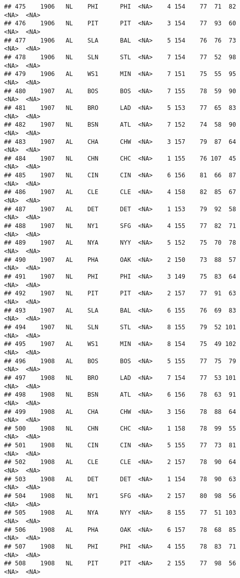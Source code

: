 \documentclass[]{article}
\begin{document}
\begin{verbatim}
## 475    1906   NL    PHI      PHI  <NA>    4 154    77  71  82   <NA>  <NA>
## 476    1906   NL    PIT      PIT  <NA>    3 154    77  93  60   <NA>  <NA>
## 477    1906   AL    SLA      BAL  <NA>    5 154    76  76  73   <NA>  <NA>
## 478    1906   NL    SLN      STL  <NA>    7 154    77  52  98   <NA>  <NA>
## 479    1906   AL    WS1      MIN  <NA>    7 151    75  55  95   <NA>  <NA>
## 480    1907   AL    BOS      BOS  <NA>    7 155    78  59  90   <NA>  <NA>
## 481    1907   NL    BRO      LAD  <NA>    5 153    77  65  83   <NA>  <NA>
## 482    1907   NL    BSN      ATL  <NA>    7 152    74  58  90   <NA>  <NA>
## 483    1907   AL    CHA      CHW  <NA>    3 157    79  87  64   <NA>  <NA>
## 484    1907   NL    CHN      CHC  <NA>    1 155    76 107  45   <NA>  <NA>
## 485    1907   NL    CIN      CIN  <NA>    6 156    81  66  87   <NA>  <NA>
## 486    1907   AL    CLE      CLE  <NA>    4 158    82  85  67   <NA>  <NA>
## 487    1907   AL    DET      DET  <NA>    1 153    79  92  58   <NA>  <NA>
## 488    1907   NL    NY1      SFG  <NA>    4 155    77  82  71   <NA>  <NA>
## 489    1907   AL    NYA      NYY  <NA>    5 152    75  70  78   <NA>  <NA>
## 490    1907   AL    PHA      OAK  <NA>    2 150    73  88  57   <NA>  <NA>
## 491    1907   NL    PHI      PHI  <NA>    3 149    75  83  64   <NA>  <NA>
## 492    1907   NL    PIT      PIT  <NA>    2 157    77  91  63   <NA>  <NA>
## 493    1907   AL    SLA      BAL  <NA>    6 155    76  69  83   <NA>  <NA>
## 494    1907   NL    SLN      STL  <NA>    8 155    79  52 101   <NA>  <NA>
## 495    1907   AL    WS1      MIN  <NA>    8 154    75  49 102   <NA>  <NA>
## 496    1908   AL    BOS      BOS  <NA>    5 155    77  75  79   <NA>  <NA>
## 497    1908   NL    BRO      LAD  <NA>    7 154    77  53 101   <NA>  <NA>
## 498    1908   NL    BSN      ATL  <NA>    6 156    78  63  91   <NA>  <NA>
## 499    1908   AL    CHA      CHW  <NA>    3 156    78  88  64   <NA>  <NA>
## 500    1908   NL    CHN      CHC  <NA>    1 158    78  99  55   <NA>  <NA>
## 501    1908   NL    CIN      CIN  <NA>    5 155    77  73  81   <NA>  <NA>
## 502    1908   AL    CLE      CLE  <NA>    2 157    78  90  64   <NA>  <NA>
## 503    1908   AL    DET      DET  <NA>    1 154    78  90  63   <NA>  <NA>
## 504    1908   NL    NY1      SFG  <NA>    2 157    80  98  56   <NA>  <NA>
## 505    1908   AL    NYA      NYY  <NA>    8 155    77  51 103   <NA>  <NA>
## 506    1908   AL    PHA      OAK  <NA>    6 157    78  68  85   <NA>  <NA>
## 507    1908   NL    PHI      PHI  <NA>    4 155    78  83  71   <NA>  <NA>
## 508    1908   NL    PIT      PIT  <NA>    2 155    77  98  56   <NA>  <NA>

\end{verbatim}
\end{document}
